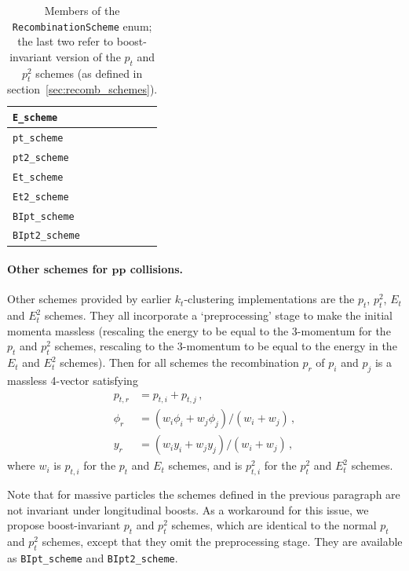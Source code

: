 \documentclass[12pt,a4]{article}
\newcommand{\ttt}[1]{{\small\texttt{#1}}}
\begin{document}
\begin{table}
  \centering
  \begin{tabular}{|l|}\hline
    \ttt{E\_scheme}     \\\hline
    \ttt{pt\_scheme}    \\\hline
    \ttt{pt2\_scheme}   \\\hline
    \ttt{Et\_scheme}    \\\hline
    \ttt{Et2\_scheme}   \\\hline
    \ttt{BIpt\_scheme}  \\\hline
    \ttt{BIpt2\_scheme} \\\hline
  \end{tabular}
  \caption{Members of the \ttt{RecombinationScheme} enum; the last two
    refer to boost-invariant version of the $p_t$ and $p_t^2$ schemes
    (as defined in section~\ref{sec:recomb_schemes}).}
  \label{tab:RecombSchemes}
\end{table}

\paragraph{Other schemes for $\boldsymbol{pp}$ collisions.} Other
schemes provided by earlier $k_t$-clustering implementations
\cite{KtClus,KtJet} are the $p_t$, $p_t^2$, $E_t$ and $E_t^2$ schemes. They
all incorporate a `preprocessing' stage to make the initial momenta
massless (rescaling the energy to be equal to the 3-momentum for the
$p_t$ and $p_t^2$ schemes, rescaling to the 3-momentum to be equal to
the energy in the $E_t$ and $E_t^2$ schemes). Then for all schemes the
recombination $p_r$ of $p_i$ and $p_j$ is a massless 4-vector
satisfying
\begin{subequations}
  \begin{align}
    p_{t,r} &= p_{t,i} + p_{t,j}\,,\\
    \phi_r &= (w_i \phi_i + w_j \phi_j)/(w_i + w_j)\,,\\
    y_r &= (w_i y_i + w_j y_j)/(w_i + w_j)\,,
  \end{align}
\end{subequations}
where $w_i$ is $p_{t,i}$ for the $p_t$ and $E_t$ schemes, and is
$p_{t,i}^2$ for the $p_t^2$ and $E_t^2$ schemes. 

Note that for massive particles the schemes defined in the previous
paragraph are not invariant under longitudinal boosts. 
%
As a workaround for this issue, we propose boost-invariant $p_t$ and
$p_t^2$ schemes, which are identical to the normal $p_t$ and $p_t^2$
schemes, except that they omit the preprocessing stage. They are
available as \ttt{BIpt\_scheme} and \ttt{BIpt2\_scheme}.
\end{document}
